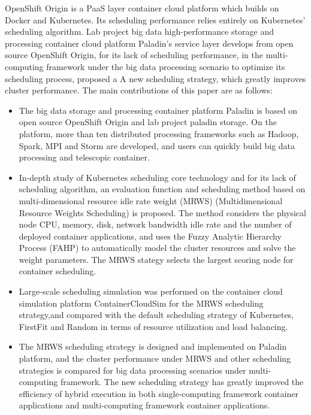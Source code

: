 \begin{eabstract}
OpenShift Origin is a PaaS layer container cloud platform which builds on Docker and Kubernetes. Its scheduling performance relies entirely on Kubernetes' scheduling algorithm. Lab project big data high-performance storage and processing container cloud platform Paladin's service layer develops from open source OpenShift Origin, for its lack of scheduling performance, in the multi-computing framework under the big data processing scenario to optimize its scheduling process, proposed a A new scheduling strategy, which greatly improves cluster performance. The main contributions of this paper are as follows:
\begin{itemize}
	\item The big data storage and processing container platform Paladin is based on open source OpenShift Origin and lab project paladin storage. On the platform, more than ten distributed processing frameworks such as Hadoop, Spark, MPI and Storm are developed, and users can quickly build big data processing and telescopic container.
	\item In-depth study of Kubernetes scheduling core technology and for its lack of scheduling algorithm, an evaluation function and scheduling method based on multi-dimensional resource idle rate weight (MRWS) (Multidimensional Resource Weights Scheduling) is proposed. The method considers the physical node CPU, memory, disk, network bandwidth idle rate and the number of deployed container applications, and uses the Fuzzy Analytic Hierarchy Process (FAHP) to automatically model the cluster resources and solve the weight parameters. The MRWS stategy selects the largest scoring node for container scheduling.
	\item Large-scale scheduling simulation was performed on the container cloud simulation platform ContainerCloudSim for the MRWS scheduling strategy,and compared with the default scheduling strategy of Kubernetes, FirstFit and Random in terms of resource utilization and load balancing.
	\item The MRWS scheduling strategy is designed and implemented on Paladin platform, and the cluster performance under MRWS and other scheduling strategies is compared for big data processing scenarios under multi-computing framework. The new scheduling strategy has greatly improved the efficiency of hybrid execution in both single-computing framework container applications and multi-computing framework container applications.
\end{itemize}
  
\end{eabstract}











